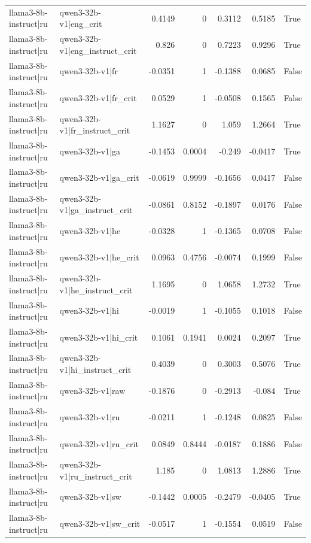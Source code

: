 \begin{table}
\begin{tabular}{l l r r r r l}
llama3-8b-instruct|ru & qwen3-32b-v1|eng_crit & 0.4149 & 0 & 0.3112 & 0.5185 & True \\
llama3-8b-instruct|ru & qwen3-32b-v1|eng_instruct_crit & 0.826 & 0 & 0.7223 & 0.9296 & True \\
llama3-8b-instruct|ru & qwen3-32b-v1|fr & -0.0351 & 1 & -0.1388 & 0.0685 & False \\
llama3-8b-instruct|ru & qwen3-32b-v1|fr_crit & 0.0529 & 1 & -0.0508 & 0.1565 & False \\
llama3-8b-instruct|ru & qwen3-32b-v1|fr_instruct_crit & 1.1627 & 0 & 1.059 & 1.2664 & True \\
llama3-8b-instruct|ru & qwen3-32b-v1|ga & -0.1453 & 0.0004 & -0.249 & -0.0417 & True \\
llama3-8b-instruct|ru & qwen3-32b-v1|ga_crit & -0.0619 & 0.9999 & -0.1656 & 0.0417 & False \\
llama3-8b-instruct|ru & qwen3-32b-v1|ga_instruct_crit & -0.0861 & 0.8152 & -0.1897 & 0.0176 & False \\
llama3-8b-instruct|ru & qwen3-32b-v1|he & -0.0328 & 1 & -0.1365 & 0.0708 & False \\
llama3-8b-instruct|ru & qwen3-32b-v1|he_crit & 0.0963 & 0.4756 & -0.0074 & 0.1999 & False \\
llama3-8b-instruct|ru & qwen3-32b-v1|he_instruct_crit & 1.1695 & 0 & 1.0658 & 1.2732 & True \\
llama3-8b-instruct|ru & qwen3-32b-v1|hi & -0.0019 & 1 & -0.1055 & 0.1018 & False \\
llama3-8b-instruct|ru & qwen3-32b-v1|hi_crit & 0.1061 & 0.1941 & 0.0024 & 0.2097 & True \\
llama3-8b-instruct|ru & qwen3-32b-v1|hi_instruct_crit & 0.4039 & 0 & 0.3003 & 0.5076 & True \\
llama3-8b-instruct|ru & qwen3-32b-v1|raw & -0.1876 & 0 & -0.2913 & -0.084 & True \\
llama3-8b-instruct|ru & qwen3-32b-v1|ru & -0.0211 & 1 & -0.1248 & 0.0825 & False \\
llama3-8b-instruct|ru & qwen3-32b-v1|ru_crit & 0.0849 & 0.8444 & -0.0187 & 0.1886 & False \\
llama3-8b-instruct|ru & qwen3-32b-v1|ru_instruct_crit & 1.185 & 0 & 1.0813 & 1.2886 & True \\
llama3-8b-instruct|ru & qwen3-32b-v1|sw & -0.1442 & 0.0005 & -0.2479 & -0.0405 & True \\
llama3-8b-instruct|ru & qwen3-32b-v1|sw_crit & -0.0517 & 1 & -0.1554 & 0.0519 & False \\

\end{tabular}
\end{table}
